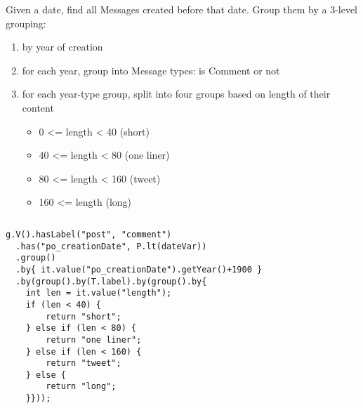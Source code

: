 \begin{center}
  \begin{minipage}{0.8\textwidth}
    Given a date, find all Messages created before that date. Group them by a 3-level grouping:
    \begin{enumerate}
    \item by year of creation
    \item for each year, group into Message types: is Comment or not
    \item for each year-type group, split into four groups based on length of their content
      \begin{itemize}
      \item 0 <= length < 40 (short)
      \item 40 <= length < 80 (one liner)
      \item 80 <= length < 160 (tweet)
      \item 160 <= length (long)
      \end{itemize}
    \end{enumerate}
  \end{minipage}
\end{center}
$\:$\\
\begin{lstlisting}
g.V().hasLabel("post", "comment")
  .has("po_creationDate", P.lt(dateVar))
  .group()
  .by{ it.value("po_creationDate").getYear()+1900 }
  .by(group().by(T.label).by(group().by{
    int len = it.value("length");
    if (len < 40) {
        return "short";
    } else if (len < 80) {
        return "one liner";
    } else if (len < 160) {
        return "tweet";
    } else {
        return "long";
    }}));
\end{lstlisting}


